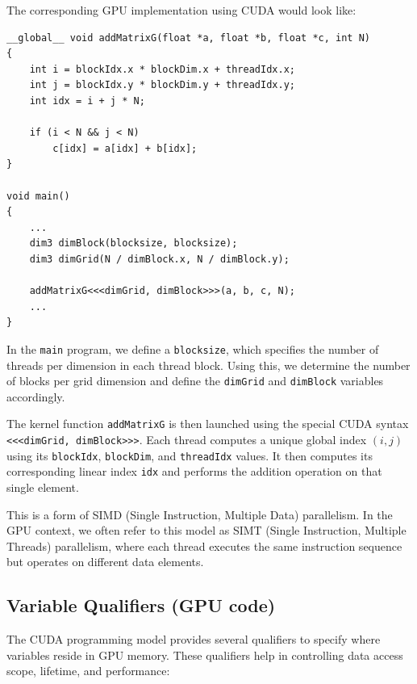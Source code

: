 \documentclass[12pt]{book}
\begin{document}
The corresponding GPU implementation using CUDA would look like:

\begin{lstlisting}[style=cppstyle]
__global__ void addMatrixG(float *a, float *b, float *c, int N)
{
    int i = blockIdx.x * blockDim.x + threadIdx.x;
    int j = blockIdx.y * blockDim.y + threadIdx.y;
    int idx = i + j * N;

    if (i < N && j < N)
        c[idx] = a[idx] + b[idx];
}

void main()
{
    ...
    dim3 dimBlock(blocksize, blocksize);
    dim3 dimGrid(N / dimBlock.x, N / dimBlock.y);

    addMatrixG<<<dimGrid, dimBlock>>>(a, b, c, N);
    ...
}
\end{lstlisting}

In the \texttt{main} program, we define a \texttt{blocksize}, which specifies the number of threads per dimension in each thread block. Using this, we determine the number of blocks per grid dimension and define the \texttt{dimGrid} and \texttt{dimBlock} variables accordingly.

The kernel function \texttt{addMatrixG} is then launched using the special CUDA syntax \texttt{<<<dimGrid, dimBlock>>>}. Each thread computes a unique global index $(i, j)$ using its \texttt{blockIdx}, \texttt{blockDim}, and \texttt{threadIdx} values. It then computes its corresponding linear index \texttt{idx} and performs the addition operation on that single element.

This is a form of SIMD (Single Instruction, Multiple Data) parallelism. In the GPU context, we often refer to this model as SIMT (Single Instruction, Multiple Threads) parallelism, where each thread executes the same instruction sequence but operates on different data elements.

\subsection{Variable Qualifiers (GPU code)}
The CUDA programming model provides several qualifiers to specify where variables reside in GPU memory. These qualifiers help in controlling data access scope, lifetime, and performance:
\end{document}
